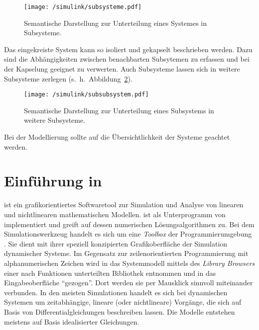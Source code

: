 \begin{figure}[h!]
	\centering
	\texttt{[image: /simulink/subsysteme.pdf]}
	\label{fig:subsysteme}
	\caption{Semantische Darstellung zur Unterteilung eines Systemes in Subsysteme.}
\end{figure}

Das eingekreiste System kann so isoliert und gekapselt beschrieben werden.
Dazu sind die Abhängigkeiten zwischen benachbarten Subsytemen zu erfassen und bei der Kapselung geeignet zu verwerten.
Auch Subsysteme lassen sich in weitere Subsysteme zerlegen (s.~h.~Abbildung~\ref{fig:subsubsysteme}).

\begin{figure}[h!]
	\centering
	\texttt{[image: /simulink/subsubsystem.pdf]}
	\label{fig:subsubsysteme}
	\caption{Semantische Darstellung zur Unterteilung eines Subsystems in weitere Subsysteme.}
\end{figure}

Bei der Modellierung sollte auf die Übersichtlichkeit der Systeme geachtet werden.

\section{Einführung in }\label{sec:simulink}

 ist ein grafikorientiertes Softwaretool zur Simulation und Analyse von linearen und nichtlinearen mathematischen Modellen.
 ist als Unterprogramm von  implementiert und greift auf dessen numerischen Lösungsalgorithmen zu.
Bei dem Simulationswerkzeug  handelt es sich um eine \emph{Toolbox} der Programmierumgebung .
Sie dient mit ihrer speziell konzipierten Grafikoberfläche der Simulation dynamischer Systeme.
Im Gegensatz zur zeilenorientierten Programmierung mit alphanumerischen Zeichen wird in  das Systemmodell mittels des \emph{ Library Browsers} einer nach Funktionen unterteilten Bibliothek entnommen und in das Eingabeoberfläche \enquote{gezogen}.
Dort werden sie per Mausklick sinnvoll miteinander verbunden.
In den meisten Simulationen handelt es sich bei dynamischen Systemen um zeitabhängige, lineare (oder nichtlineare) Vorgänge, die sich auf Basis von Differentialgleichungen beschreiben lassen.
Die Modelle entstehen meistens auf Basis idealisierter Gleichungen.

